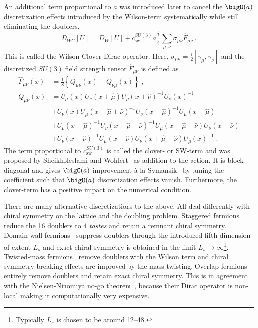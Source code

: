 An additional term proportional to $a$ was introduced later to cancel the $\bigO(a)$ discretization effects introduced by the Wilson-term systematically while still eliminating the doublers,
\begin{equation}
D_{WC}[U] = D_W[U] + c_\mathrm{sw}^{SU(3)} a \frac{i}{4} \sum_{\mu, \nu} \sigma_{\mu \nu} \hat{F}_{\mu \nu} \;.
\end{equation}
This is called the Wilson-Clover Dirac operator.
Here, $\sigma_{\mu \nu} = \frac{i}{2} \left[\gamma_{\mu}, \gamma_{\nu}\right]$ and the discretized $SU(3)$ field strength tensor $\hat{F}_{\mu \nu}$ is defined as
\begin{equation}
\begin{aligned} \label{eq:intro:clover}
\hat{F}_{\mu \nu}(x) &= \frac{1}{8} \left\{
    Q_{\mu \nu}(x) - Q_{\nu \mu}(x)
\right\} \;, \\
Q_{\mu \nu}(x)
&= U_{\mu}(x)
   U_{\nu}(x+\hat{\mu})
   U_{\mu}(x+\hat{\nu})^{-1}
   U_{\nu}(x)^{-1} \\
&+ U_{\nu}(x)
   U_{\mu}(x-\hat{\mu}+\hat{\nu})^{-1}
   U_{\nu}(x-\hat{\mu})^{-1}
   U_{\mu}(x-\hat{\mu}) \\
&+ U_{\mu}(x-\hat{\mu})^{-1}
   U_{\nu}(x-\hat{\mu}-\hat{\nu})^{-1}
   U_{\mu}(x-\hat{\mu}-\hat{\nu})
   U_{\nu}(x-\hat{\nu}) \\
&+ U_{\nu}(x-\hat{\nu})^{-1}
   U_{\mu}(x-\hat{\nu})
   U_{\nu}(x+\hat{\mu}-\hat{\nu})
   U_{\mu}(x)^{-1} \;.
\end{aligned}
\end{equation}
The term proportional to $c_\mathrm{sw}^{SU(3)}$ is called the clover- or SW-term and was proposed by Sheikholeslami and Wohlert~\cite{sw1985} as addition to the action.
It is block-diagonal and gives $\bigO(a)$ improvement à la Symansik~\cite{symanzik1982,SYMANZIK1983} by tuning the coefficient such that $\bigO(a)$ discretization effects vanish.
Furthermore, the clover-term has a positive impact on the numerical condition.

There are many alternative discretizations to the above.
All deal differently with chiral symmetry on the lattice and the doubling problem.
Staggered fermions~\cite{PhysRevD.11.395} reduce the \num{16} doublers to \num{4} \emph{tastes} and retain a remnant  chiral symmetry.
Domain-wall fermions~\cite{Kaplan:1992bt,Shamir:1993zy} suppress doublers through the introduced fifth dimension of extent $L_s$ and exact chiral symmetry is obtained in the limit $L_s \to \infty$\footnote{Typically $L_s$ is chosen to be around \numrange{12}{48}.}.
Twisted-mass fermions~\cite{Frezzotti:2000nk} remove doublers with the Wilson term and chiral symmetry breaking effects are improved by the mass twisting.
Overlap fermions~\cite{Neuberger:1997fp,Neuberger:1998wv} entirely remove doublers and retain exact chiral symmetry.
This is in agreement with the Nielsen-Ninomiya no-go theorem~\cite{Nielsen:1980rz,Nielsen:1981xu}, because their Dirac operator is non-local making it computationally very expensive.

